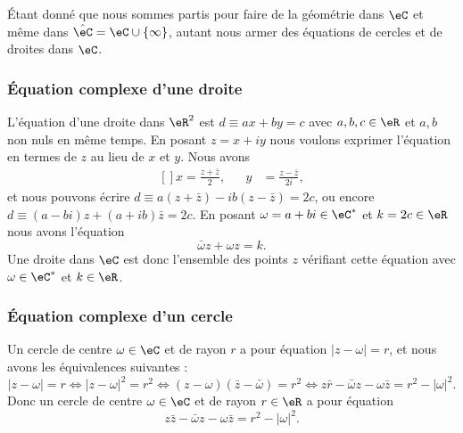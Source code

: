 Étant donné que nous sommes partis pour faire de la géométrie dans \( \eC\) et même dans \( \hat \eC=\eC\cup \{ \infty \}\), autant nous armer des équations de cercles et de droites dans \( \eC\).

\subsubsection{Équation complexe d'une droite}

L'équation d'une droite dans \( \eR^2\) est \( d\equiv ax+by=c\) avec \( a,b,c\in \eR\) et \( a,b\) non nuls en même temps. En posant \( z=x+iy\) nous voulons exprimer l'équation en termes de \( z\) au lieu de \( x\) et \( y\). Nous avons\cite{ooWNHWooGUnivi}
\begin{equation}
    \begin{aligned}[]
        x=\frac{ z+\bar z }{2},&&y&=\frac{ z-\bar z }{ 2i },
    \end{aligned}
\end{equation}
et nous pouvons écrire \( d\equiv a(z+\bar z)-ib(z-\bar z)=2c\), ou encore \( d\equiv (a-bi)z+(a+ib)\bar z=2c\). En posant \( \omega=a+bi\in \eC^*\) et \( k=2c\in \eR\) nous avons l'équation
\begin{equation}        \label{EQooPRCPooVvrHME}
    \bar \omega z+\omega z=k.
\end{equation}
Une droite dans \( \eC\) est donc l'ensemble des points \( z\) vérifiant cette équation avec \( \omega\in \eC^*\) et \( k\in \eR\).

\subsubsection{Équation complexe d'un cercle}

Un cercle de centre \( \omega\in \eC\) et de rayon \( r\) a pour équation \( | z-\omega |=r\), et nous avons les équivalences suivantes :
\begin{equation}
    | z-\omega |=r\Leftrightarrow | z-\omega |^2=r^2\Leftrightarrow (z-\omega)(\bar z-\bar \omega)=r^2\Leftrightarrow z\bar r-\bar \omega z-\omega \bar z=r^2-| \omega |^2.
\end{equation}
Donc un cercle de centre \( \omega\in \eC\) et de rayon \( r\in \eR\) a pour équation
\begin{equation}        \label{EQooDIFRooKRZZoi}
    z\bar z-\bar\omega z-\omega\bar z=r^2-| \omega |^2.
\end{equation}

